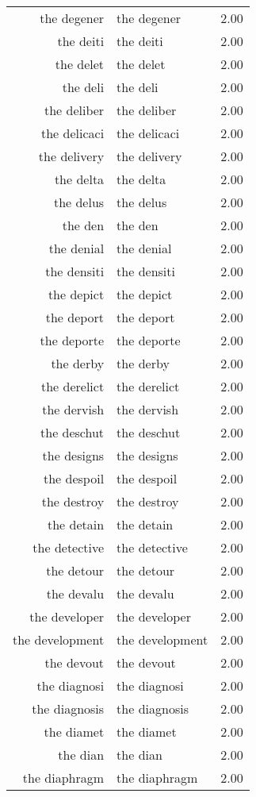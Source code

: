 \begin{table}[ht]
\begin{tabular}{rlr}
  the degener & the degener & 2.00 \\ 
  the deiti & the deiti & 2.00 \\ 
  the delet & the delet & 2.00 \\ 
  the deli & the deli & 2.00 \\ 
  the deliber & the deliber & 2.00 \\ 
  the delicaci & the delicaci & 2.00 \\ 
  the delivery & the delivery & 2.00 \\ 
  the delta & the delta & 2.00 \\ 
  the delus & the delus & 2.00 \\ 
  the den & the den & 2.00 \\ 
  the denial & the denial & 2.00 \\ 
  the densiti & the densiti & 2.00 \\ 
  the depict & the depict & 2.00 \\ 
  the deport & the deport & 2.00 \\ 
  the deporte & the deporte & 2.00 \\ 
  the derby & the derby & 2.00 \\ 
  the derelict & the derelict & 2.00 \\ 
  the dervish & the dervish & 2.00 \\ 
  the deschut & the deschut & 2.00 \\ 
  the designs & the designs & 2.00 \\ 
  the despoil & the despoil & 2.00 \\ 
  the destroy & the destroy & 2.00 \\ 
  the detain & the detain & 2.00 \\ 
  the detective & the detective & 2.00 \\ 
  the detour & the detour & 2.00 \\ 
  the devalu & the devalu & 2.00 \\ 
  the developer & the developer & 2.00 \\ 
  the development & the development & 2.00 \\ 
  the devout & the devout & 2.00 \\ 
  the diagnosi & the diagnosi & 2.00 \\ 
  the diagnosis & the diagnosis & 2.00 \\ 
  the diamet & the diamet & 2.00 \\ 
  the dian & the dian & 2.00 \\ 
  the diaphragm & the diaphragm & 2.00 \\ 

\end{tabular}
\end{table}
